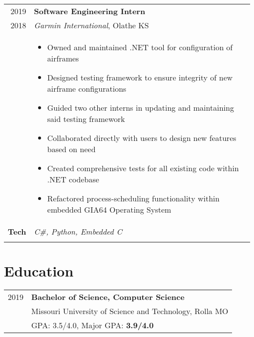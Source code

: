 \documentclass[a4paper,10pt]{article}
\newcommand{\br}{\\\multicolumn{2}{c}{}}
\begin{document}
\begin{tabular}{r p{15cm}}
  \textsc{2019} & \textbf{Software Engineering Intern} \\
  \textsc{2018} & \textit{Garmin International}, Olathe KS
  \\ &
       \begin{itemize}
       \item Owned and maintained .NET tool for configuration of airframes
       \item Designed testing framework to ensure integrity of new airframe configurations
       \item Guided two other interns in updating and maintaining said testing framework
       \item Collaborated directly with users to design new features based on need
       \item Created comprehensive tests for all existing code within .NET codebase
       \item Refactored process-scheduling functionality within embedded GIA64 Operating System

       \end{itemize} \\
  \textbf{Tech} & \textit{C\#, Python, Embedded C} \br \\
\end{tabular}

\section{Education}
\begin{tabular}{r p{15cm}}
  \textsc{2019} & \textbf{Bachelor of Science, Computer Science} \\
                & Missouri University of Science and Technology, Rolla MO  \\
                & GPA: 3.5/4.0, Major GPA: \textbf{3.9/4.0} \\
\end{tabular}
\end{document}
